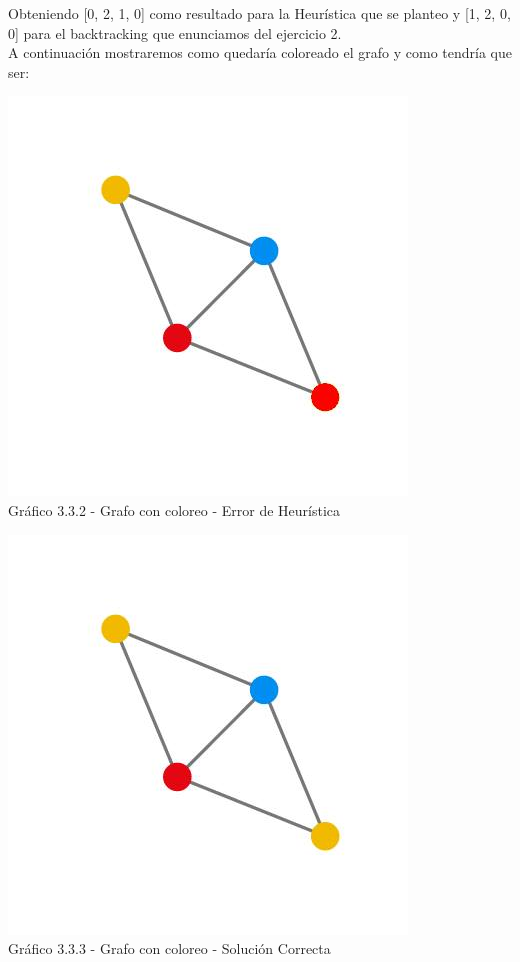 Obteniendo  [0, 2, 1, 0] como resultado para la Heurística que se planteo y [1, 2, 0, 0] para el backtracking que enunciamos del ejercicio 2.\\

A continuación mostraremos como quedaría coloreado el grafo y como tendría que ser:\\

\vspace*{0.3cm} \vspace*{0.3cm}
  \begin{center}
 \includegraphics[scale=0.5]{./ej3/parte3/grafo1color.jpg}
 	{\\Gráfico 3.3.2 - Grafo con coloreo - Error de Heurística}
  \end{center}
  \vspace*{0.3cm}

  \vspace*{0.3cm} \vspace*{0.3cm}
  \begin{center}
 \includegraphics[scale=0.5]{./ej3/parte3/grafo1color2.jpg}
 	{\\Gráfico 3.3.3 - Grafo con coloreo - Solución Correcta}
  \end{center}
  \vspace*{0.3cm}
  

